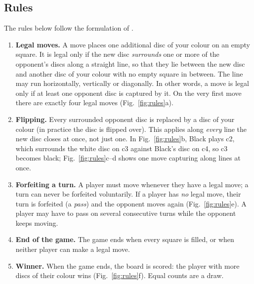 \documentclass[11pt]{article}
\begin{document}
\subsection{Rules}
The rules below follow the formulation of \cite{cs121}.
\begin{enumerate}[leftmargin=*]
  \item \textbf{Legal moves.} A move places one additional disc of your colour
        on an empty square. It is legal only if the new disc \emph{surrounds}
        one or more of the opponent's discs along a straight line, so that they
        lie between the new disc and another disc of your colour with no empty
        square in between. The line may run horizontally, vertically or
        diagonally. In other words, a move is legal only if at least one
        opponent disc is captured by it. On the very first move there are
        exactly four legal moves (Fig.~\ref{fig:rules}a).
  \item \textbf{Flipping.} Every surrounded opponent disc is replaced by a disc
        of your colour (in practice the disc is flipped over). This applies
        along \emph{every} line the new disc closes at once, not just one. In
        Fig.~\ref{fig:rules}b, Black plays c2, which surrounds the white disc
        on c3 against Black's disc on c4, so c3 becomes black;
        Fig.~\ref{fig:rules}c--d shows one move capturing along \RuleMultiDirs{}
        lines at once.
  \item \textbf{Forfeiting a turn.} A player must move whenever they have a
        legal move; a turn can never be forfeited voluntarily. If a player has
        \emph{no} legal move, their turn is forfeited (a \emph{pass}) and the
        opponent moves again (Fig.~\ref{fig:rules}e). A player may have to pass on several consecutive
        turns while the opponent keeps moving.
  \item \textbf{End of the game.} The game ends when every square is filled,
        or when neither player can make a legal move.
  \item \textbf{Winner.} When the game ends, the board is scored: the player
        with more discs of their colour wins (Fig.~\ref{fig:rules}f). Equal counts are a draw.
\end{enumerate}
\end{document}

